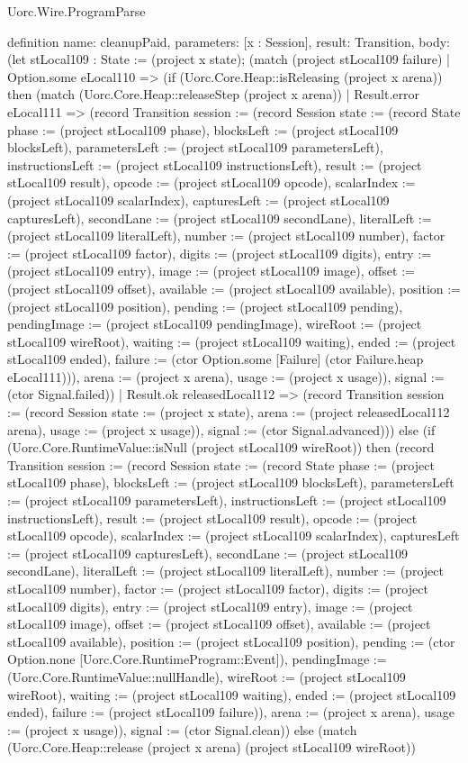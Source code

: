 \begin{lexlean}{Uorc.Wire.ProgramParse}
\begin{semanticmodule}
definition{
  name: cleanupPaid,
  parameters: [x : Session],
  result: Transition,
  body: (let stLocal109 : State := (project x state); (match (project stLocal109 failure)
    | Option.some eLocal110 => (if (Uorc.Core.Heap::isReleasing (project x arena)) then (match (Uorc.Core.Heap::releaseStep (project x arena))
      | Result.error eLocal111 => (record Transition {session := (record Session {state := (record State {phase := (project stLocal109 phase), blocksLeft := (project stLocal109 blocksLeft), parametersLeft := (project stLocal109 parametersLeft), instructionsLeft := (project stLocal109 instructionsLeft), result := (project stLocal109 result), opcode := (project stLocal109 opcode), scalarIndex := (project stLocal109 scalarIndex), capturesLeft := (project stLocal109 capturesLeft), secondLane := (project stLocal109 secondLane), literalLeft := (project stLocal109 literalLeft), number := (project stLocal109 number), factor := (project stLocal109 factor), digits := (project stLocal109 digits), entry := (project stLocal109 entry), image := (project stLocal109 image), offset := (project stLocal109 offset), available := (project stLocal109 available), position := (project stLocal109 position), pending := (project stLocal109 pending), pendingImage := (project stLocal109 pendingImage), wireRoot := (project stLocal109 wireRoot), waiting := (project stLocal109 waiting), ended := (project stLocal109 ended), failure := (ctor Option.some [Failure] (ctor Failure.heap eLocal111))}), arena := (project x arena), usage := (project x usage)}), signal := (ctor Signal.failed)})
      | Result.ok releasedLocal112 => (record Transition {session := (record Session {state := (project x state), arena := (project releasedLocal112 arena), usage := (project x usage)}), signal := (ctor Signal.advanced)})) else (if (Uorc.Core.RuntimeValue::isNull (project stLocal109 wireRoot)) then (record Transition {session := (record Session {state := (record State {phase := (project stLocal109 phase), blocksLeft := (project stLocal109 blocksLeft), parametersLeft := (project stLocal109 parametersLeft), instructionsLeft := (project stLocal109 instructionsLeft), result := (project stLocal109 result), opcode := (project stLocal109 opcode), scalarIndex := (project stLocal109 scalarIndex), capturesLeft := (project stLocal109 capturesLeft), secondLane := (project stLocal109 secondLane), literalLeft := (project stLocal109 literalLeft), number := (project stLocal109 number), factor := (project stLocal109 factor), digits := (project stLocal109 digits), entry := (project stLocal109 entry), image := (project stLocal109 image), offset := (project stLocal109 offset), available := (project stLocal109 available), position := (project stLocal109 position), pending := (ctor Option.none [Uorc.Core.RuntimeProgram::Event]), pendingImage := (Uorc.Core.RuntimeValue::nullHandle), wireRoot := (project stLocal109 wireRoot), waiting := (project stLocal109 waiting), ended := (project stLocal109 ended), failure := (project stLocal109 failure)}), arena := (project x arena), usage := (project x usage)}), signal := (ctor Signal.clean)}) else (match (Uorc.Core.Heap::release (project x arena) (project stLocal109 wireRoot))
}
\end{semanticmodule}
\end{lexlean}
